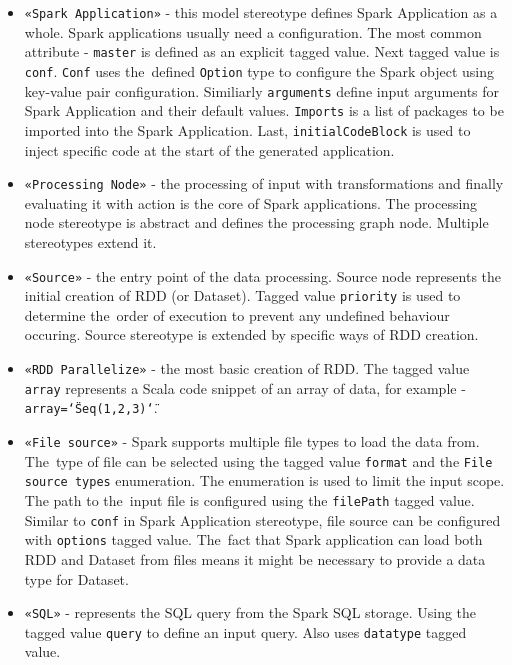 \begin{itemize}
\item \texttt{«Spark Application»} - this model stereotype defines Spark Application as a whole. Spark applications usually need a configuration. The most common attribute - \texttt{master} is defined as an explicit tagged value. Next tagged value is \texttt{conf}. \texttt{Conf} uses the~defined \texttt{Option} type to configure the Spark object using key-value pair configuration. Similiarly \texttt{arguments} define input arguments for Spark Application and their default values. \texttt{Imports} is a list of packages to be imported into the Spark Application. Last, \texttt{initialCodeBlock} is used to inject specific code at the start of the generated application. 


\item \texttt{«Processing Node»} -  the processing of input with transformations and finally evaluating it with action is the core of Spark applications. The processing node stereotype is abstract and defines the processing graph node. Multiple stereotypes extend it.

\item \texttt{«Source»} - the entry point of the data processing. Source node represents the initial creation of RDD (or Dataset).
Tagged value \texttt{priority} is used to determine the~order of execution to prevent any undefined behaviour occuring.
Source stereotype is extended by specific ways of RDD creation.

\item \texttt{«RDD Parallelize»} - the most basic creation of RDD. The tagged value \texttt{array} represents a Scala code snippet of an array of data, for example - \texttt{array=\char`\"Seq(1,2,3)\char`\"}. 

\item \texttt{«File source»} - Spark supports multiple file types to load the data from. The~type of file can be selected using the tagged value \texttt{format} and the \texttt{File source types} enumeration.  The enumeration is used to limit the input scope. The path to the~input file is configured using the \texttt{filePath} tagged value. Similar to \texttt{conf} in Spark Application stereotype, file source can be configured with \texttt{options} tagged value. The~fact that Spark application can load both RDD and Dataset from files means it might be necessary to provide a data type for Dataset. 

\item \texttt{«SQL»} - represents the SQL query from the Spark SQL storage. Using the tagged value \texttt{query} to define an input query. Also uses \texttt{datatype} tagged value.


\end{itemize}
